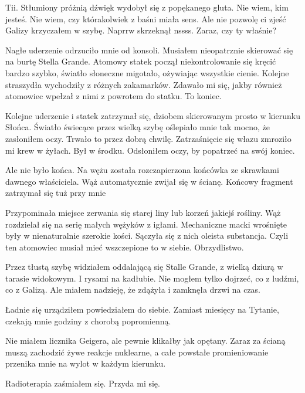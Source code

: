 \begin{dialogue}
	\ds{} Tii. \dm{} Stłumiony próżnią dźwięk wydobył się z popękanego gluta.
	\ds{} Nie wiem, kim jesteś. Nie wiem, czy którakolwiek z baśni miała sens. Ale nie pozwolę ci zjeść Galizy \dm{} krzyczałem w szybę. 
	\ds{} Naprrw \dm{} skrzeknął \dm{} nssss.
	\ds{} Zaraz, czy ty właśnie?
\end{dialogue}

Nagłe uderzenie odrzuciło mnie od konsoli.
Musiałem nieopatrznie skierować się na burtę Stella Grande.
Atomowy statek począł niekontrolowanie się kręcić bardzo szybko, światło słoneczne migotało, ożywiając wszystkie cienie.
Kolejne straszydła wychodziły z różnych zakamarków.
Zdawało mi się, jakby również atomowiec wpełzał z nimi z powrotem do statku.
To koniec.

Kolejne uderzenie i statek zatrzymał się, dziobem skierowanym prosto w kierunku Słońca.
Światło świecące przez wielką szybę oślepiało mnie tak mocno, że zasłoniłem oczy.
Trwało to przez dobrą chwilę.
Zatrzaśnięcie się włazu zmroziło mi krew w żyłach. Był w środku. Odsłoniłem oczy, by popatrzeć na swój koniec.

Ale nie było końca.
Na wężu została rozczapierzona końcówka ze skrawkami dawnego właściciela.
Wąż automatycznie zwijał się w ścianę.
Końcowy fragment zatrzymał się tuż przy mnie

Przypominała miejsce zerwania się starej liny lub korzeń jakiejś rośliny.
Wąż rozdzielał się na serię małych wężyków z igłami.
Mechaniczne macki wrośnięte były w nienaturalnie szerokie kości.
Sączyła się z nich oleista substancja.
Czyli ten atomowiec musiał mieć wszczepione to w siebie.
Obrzydlistwo.

Przez tłustą szybę widziałem oddalającą się Stalle Grande, z wielką dziurą w tarasie widokowym.
I rysami na kadłubie.
Nie mogłem tylko dojrzeć, co z ludźmi, co z Galizą.
Ale miałem nadzieję, że zdążyła i zamknęła drzwi na czas.

\begin{dialogue}
	\ds{} Ładnie się urządziłem \dm{} powiedziałem do siebie. \dm{} Zamiast miesięcy na Tytanie, czekają mnie godziny z chorobą popromienną.
\end{dialogue}
Nie miałem licznika Geigera, ale pewnie klikałby jak opętany.
Zaraz za ścianą muszą zachodzić żywe reakcje nuklearne, a całe powstałe promieniowanie przenika mnie na wylot w każdym kierunku.
\begin{dialogue}
	\ds{} Radioterapia \dm{} zaśmiałem się. \dm{} Przyda mi się.
\end{dialogue}

